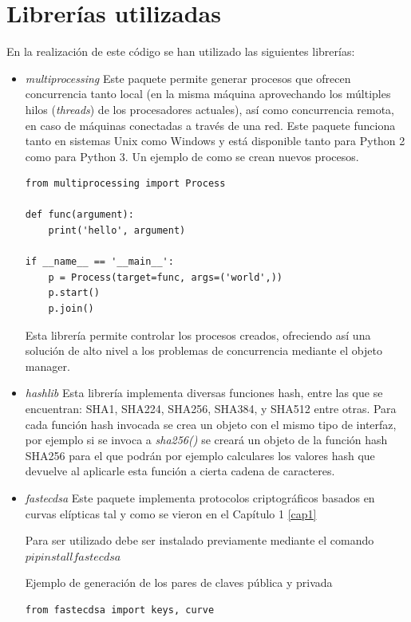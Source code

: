 \section{Librerías utilizadas}
En la realización de este código se han utilizado las siguientes librerías:
\begin{itemize}
\item \textit{multiprocessing}\cite{multiprocessing} Este paquete permite generar procesos que ofrecen concurrencia tanto local (en la misma máquina aprovechando los múltiples hilos (\textit{threads}) de los procesadores actuales), así como concurrencia remota, en caso de máquinas conectadas a través de una red. Este paquete funciona tanto en sistemas Unix como Windows y está disponible tanto para Python 2 como para Python 3.
Un ejemplo de como se crean nuevos procesos.
\lstset{language=Python}
\lstset{frame=lines}
\lstset{basicstyle=\footnotesize}
\begin{lstlisting}[title=Generación de nuevos procesos]
from multiprocessing import Process

def func(argument):
    print('hello', argument)

if __name__ == '__main__':
    p = Process(target=func, args=('world',))
    p.start()
    p.join()
\end{lstlisting}

Esta librería permite controlar los procesos creados, ofreciendo así una solución de alto nivel a los problemas de concurrencia mediante el objeto manager.

\item \textit{hashlib} \cite{hashlib} Esta librería implementa diversas funciones hash, entre las que se encuentran: SHA1, SHA224, SHA256, SHA384, y SHA512 entre otras. Para cada función hash invocada se crea un objeto con el mismo tipo de interfaz, por ejemplo si se invoca a \textit{sha256()} se creará un objeto de la función hash SHA256 para el que podrán por ejemplo calculares los valores hash que devuelve al aplicarle esta función a cierta cadena de caracteres.

\item \textit{fastecdsa} \cite{fastecdsa} Este paquete implementa protocolos criptográficos basados en curvas elípticas tal y como se vieron en el Capítulo 1 \ref{cap1} 

Para ser utilizado debe ser instalado previamente mediante el comando $pip install fastecdsa$

Ejemplo de generación de los pares de claves pública y privada
\lstset{language=Python}
\lstset{frame=lines}
\lstset{basicstyle=\footnotesize}
\begin{lstlisting}[title=Generación de claves]
from fastecdsa import keys, curve


\end{lstlisting}
\end{itemize}
